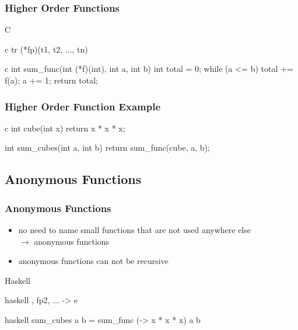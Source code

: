 \documentclass[dvipsnames]{beamer}
\theoremstyle{plain}
\begin{document}
\begin{frame}[fragile]
  \frametitle{Higher Order Functions}

  \begin{block}{C}
    \begin{pygments}{c}
      tr (*fp)(t1, t2, ..., tn)
    \end{pygments}
  \end{block}

  \pause
  \begin{example}[C]
    \begin{pygments}{c}
int sum_func(int (*f)(int), int a, int b)
{
    int total = 0;
    while (a <= b)
    {
        total += f(a);
        a += 1;
    }
    return total;
}
    \end{pygments}
  \end{example}
\end{frame}

\begin{frame}[fragile]
  \frametitle{Higher Order Function Example}

  \begin{example}[C]
    \begin{pygments}{c}
int cube(int x)
{
    return x * x * x;
}

int sum_cubes(int a, int b)
{
    return sum_func(cube, a, b);
}
    \end{pygments}
  \end{example}
\end{frame}

\subsection{Anonymous Functions}

\begin{frame}[fragile]
  \frametitle{Anonymous Functions}

  \begin{itemize}
    \item no need to name small functions that are not used anywhere else\\
      $\rightarrow$ \alert{anonymous functions}
    \item anonymous functions can not be recursive
  \end{itemize}

  \begin{block}{Haskell}
    \begin{pygments}{haskell}
      , fp2, ... -> e
    \end{pygments}
  \end{block}

  \medskip
  \begin{example}
    \begin{pygments}{haskell}
sum_cubes a b = sum_func (\x -> x * x * x) a b
    \end{pygments}
  \end{example}
\end{frame}
\end{document}
